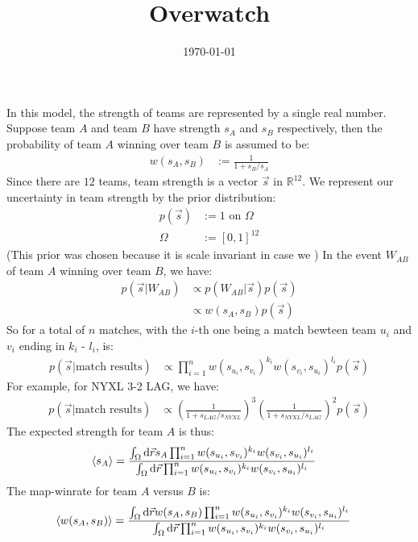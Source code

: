\documentclass[a4paper, 12pt]{article}
\title{Overwatch}
\date{\today}
\newcommand{\R}{\mathbb{R}}
\begin{document}
In this model,
the strength of teams are represented by a single real number.
Suppose team \(A\) and team \(B\) have strength \(s_A\) and \(s_B\) respectively, 
then the probability of team \(A\) winning over team \(B\) is assumed to be:
\begin{align*}
  w(s_A, s_B) &:= \frac{1}{1+s_B/s_A}
\end{align*}
Since there are \(12\) teams, 
team strength is a vector \(\vec{s}\) in \(\R^{12}\).
We represent our uncertainty in team strength by the prior distribution:
\begin{align*}
  p(\vec{s}) &:= 1 \text{ on } \Omega\\
  \Omega &:= [0,1]^{12}
\end{align*}
(This prior was chosen because it is scale invariant in case we )
In the event \(W_{AB}\) of team \(A\) winning over team \(B\),
we have:
\begin{align*}
  p(\vec{s} | W_{AB}) &\propto p(W_{AB} | \vec{s}) p(\vec{s})\\
                      &\propto w(s_A, s_B) p(\vec{s})
\end{align*}
So for a total of \(n\) matches,
with the \(i\)-th one being a match bewteen team \(u_i\) and \(v_i\) ending in \(k_i\) - \(l_i\),
is:
\begin{align*}
  p(\vec{s} | \text{match results}) &\propto \prod_{i=1}^{n} w(s_{u_i}, s_{v_i})^{k_i} w(s_{v_i}, s_{u_i})^{l_i} p(\vec{s})
\end{align*}
For example, for NYXL 3-2 LAG,
we have:
\begin{align*}
  p(\vec{s} | \text{match results}) &\propto (\frac{1}{1+s_{LAG}/s_{NYXL}})^3(\frac{1}{1+s_{NYXL}/s_{LAG}})^2 p(\vec{s})
\end{align*}
The expected strength for team \(A\) is thus:
\begin{align*}
  \expval{s_A} &= \frac{\int_{\Omega}\dd\vec{r} s_A\prod_{i=1}^{n} w(s_{u_i}, s_{v_i})^{k_i} w(s_{v_i}, s_{u_i})^{l_i}}{\int_{\Omega}\dd\vec{r}\prod_{i=1}^{n} w(s_{u_i}, s_{v_i})^{k_i} w(s_{v_i}, s_{u_i})^{l_i}}
\end{align*}
The map-winrate for team \(A\) versus \(B\) is:
\begin{align*}
  \expval{w(s_A, s_B)} &= \frac{\int_{\Omega}\dd\vec{r}w(s_A, s_B)\prod_{i=1}^{n} w(s_{u_i}, s_{v_i})^{k_i} w(s_{v_i}, s_{u_i})^{l_i}}{\int_{\Omega}\dd\vec{r}\prod_{i=1}^{n} w(s_{u_i}, s_{v_i})^{k_i} w(s_{v_i}, s_{u_i})^{l_i}}
\end{align*}
\end{document}
